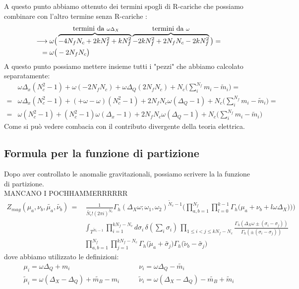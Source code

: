 \documentclass[a4paper,12pt]{article}
\begin{document}
A questo punto abbiamo ottenuto dei termini spogli di R-cariche che possiamo combinare con l'altro termine senza R-cariche :
\begin{align*}
	\longrightarrow & \; \omega \big (  \overbrace{- 4 N_f N_c  + 2 k N_f^2  +   k N_f^2}^{\hbox{ termini da } \omega \Delta_X}  \overbrace{- 2  k N_f^2 + 2 N_f N_c - 2  k N_f^2}^{\hbox{termini da } \omega} \big) = \\
	 = &\; \omega \big (  - 2 N_f N_c  \big) 
\end{align*}
A questo punto possiamo mettere insieme tutti i "pezzi" che abbiamo calcolato separatamente:
\begin{align*}
 & \omega \Delta_x ( N_c^2 - 1) + \omega ( - 2 N_f N_c  ) + \omega \Delta_Q ( 2 N_f N_c )  + N_c \big( \sum_i^{N_f} m_i - \tilde m_i  \big) =  \\
 = & \omega \Delta_x ( N_c^2 - 1) + ( + \omega - \omega)  ( N_c^2 -1 ) + 2 N_f N_c  \omega ( \Delta_Q -1 )  +  N_c \big( \sum_i^{N_f} m_i - \tilde m_i  \big) = \\
 = &\omega ( N_c^2 -1 ) + ( N_c^2 - 1) \omega (\Delta_x  - 1 ) + 2 N_f N_c  \omega ( \Delta_Q -1 )  + N_c \big( \sum_i^{N_f} m_i - \tilde m_i  \big) 
\end{align*}
Come si può vedere combacia con il contributo divergente della teoria elettrica.\\
\subsection{Formula per la funzione di partizione}
Dopo aver controllato le anomalie gravitazionali, possiamo scrivere la la funzione di partizione.\\
MANCANO I POCHHAMMERRRRRR
\begin{align*}
Z_{mag} ( \mu_a , \nu_b , \tilde{\mu_a}, \tilde{\nu_b} ) \,= & \, \frac{1}{\tilde{N_c}! (2 \pi i )^{\tilde{N_c}}}
 \Gamma_h ( \Delta_X \omega ; \omega_1 , \omega_2)^{ \tilde N_c-1}
\bigg( \prod_{a,b=1}^{N_f}   \prod_{l=0}^{k-1} \Gamma_h \big( \mu_a+  \nu_b + l \omega \Delta_X) \big)  \bigg) \\
&\int_{T^{ \tilde N_c-1}}  
\prod_{i=1}^{ kN_f - N_c} d \sigma_i \, \delta( \sum_i \sigma_i) \, 
 \prod_{ 1 \leq i<j \leq kN_f - N_c} \frac{ \Gamma_h( \Delta_X \omega \pm (\sigma_i - \sigma_j)) }{ \Gamma_h ( \pm (\sigma_i - \sigma_j) )} \\
 &  \prod_{a,b=1}^{N_f} \prod_{j=1}^{k N_f - N_c} \Gamma_h \big( \tilde \mu_a + \tilde{\sigma_j} \big) \Gamma_h \big( \tilde \nu_b - \tilde{\sigma_j} \big)  
\end{align*}
dove abbiamo utilizzato le definizioni:
\begin{align*}
 \mu_i = \omega \Delta_Q + m_i  &\qquad \nu_i = \omega \Delta_Q - \tilde{m_i}\\
 \tilde \mu_i = \omega ( \Delta_X - \Delta_Q ) + \tilde{m_B} - m_i  &  \qquad \tilde \nu_i = \omega ( \Delta_X - \Delta_Q ) - \tilde{m_B} + \tilde m_i 
\end{align*}
\end{document}
